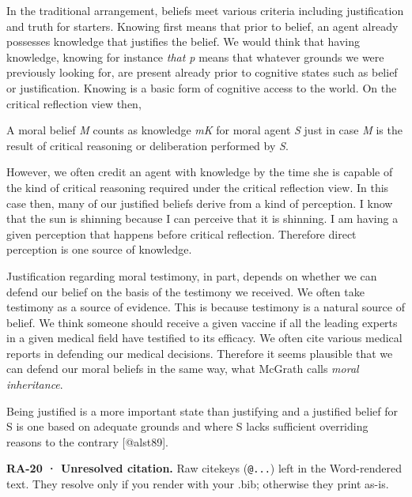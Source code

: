 \documentclass[
  letterpaper,
  DIV=11,
  numbers=noendperiod]{scrartcl}
\theoremstyle{remark}
\begin{document}
In the traditional arrangement, beliefs meet various criteria including
justification and truth for starters. Knowing first means that prior to
belief, an agent already possesses knowledge that justifies the belief.
We would think that having knowledge, knowing for instance \emph{that p}
means that whatever grounds we were previously looking for, are present
already prior to cognitive states such as belief or justification.
Knowing is a basic form of cognitive access to the world. On the
critical reflection view then,

A moral belief \emph{M} counts as knowledge \emph{mK} for moral agent
\emph{S} just in case \emph{M} is the result of critical reasoning or
deliberation performed by \emph{S}.

However, we often credit an agent with knowledge by the time she is
capable of the kind of critical reasoning required under the critical
reflection view. In this case then, many of our justified beliefs derive
from a kind of perception. I know that the sun is shinning because I can
perceive that it is shinning. I am having a given perception that
happens before critical reflection. Therefore direct perception is one
source of knowledge.

Justification regarding moral testimony, in part, depends on whether we
can defend our belief on the basis of the testimony we received. We
often take testimony as a source of evidence. This is because testimony
is a natural source of belief. We think someone should receive a given
vaccine if all the leading experts in a given medical field have
testified to its efficacy. We often cite various medical reports in
defending our medical decisions. Therefore it seems plausible that we
can defend our moral beliefs in the same way, what McGrath calls
\emph{moral inheritance}.

Being justified is a more important state than justifying and a
justified belief for S is one based on adequate grounds and where S
lacks sufficient overriding reasons to the contrary {[}@alst89{]}.

\begin{tcolorbox}[enhanced jigsaw, arc=.35mm, bottomrule=.15mm, bottomtitle=1mm, breakable, colback=white, colbacktitle=quarto-callout-warning-color!10!white, colframe=quarto-callout-warning-color-frame, coltitle=black, left=2mm, leftrule=.75mm, opacityback=0, opacitybacktitle=0.6, rightrule=.15mm, title=\textcolor{quarto-callout-warning-color}{\faExclamationTriangle}\hspace{0.5em}{Warning}, titlerule=0mm, toprule=.15mm, toptitle=1mm]

\textbf{RA-20 · Unresolved citation.} Raw citekeys (\texttt{@...}) left
in the Word-rendered text. They resolve only if you render with your
.bib; otherwise they print as-is.

\end{tcolorbox}
\end{document}
